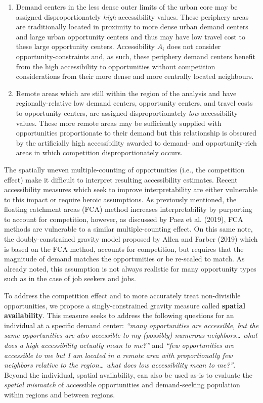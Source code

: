 \documentclass[]{elsarticle} %
\begin{document}
\begin{enumerate}
\def\labelenumi{\arabic{enumi})}
\item
  Demand centers in the less dense outer limits of the urban core may be
  assigned disproportionately \emph{high} accessibility values. These
  periphery areas are traditionally located in proximity to more dense
  urban demand centers and large urban opportunity centers and thus may
  have low travel cost to these large opportunity centers. Accessibility
  \(A_i\) does not consider opportunity-constraints and, as such, these
  periphery demand centers benefit from the high accessibility to
  opportunities without competition considerations from their more dense
  and more centrally located neighbours.
\item
  Remote areas which are still within the region of the analysis and
  have regionally-relative low demand centers, opportunity centers, and
  travel costs to opportunity centers, are assigned disproportionately
  \emph{low} accessibility values. These more remote areas may be
  sufficiently supplied with opportunities proportionate to their demand
  but this relationship is obscured by the artificially high
  accessibility awarded to demand- and opportunity-rich areas in which
  competition disproportionately occurs.
\end{enumerate}

The spatially uneven multiple-counting of opportunities (i.e., the
competition effect) make it difficult to interpret resulting
accessibility estimates. Recent accessibility measures which seek to
improve interpretability are either vulnerable to this impact or require
heroic assumptions. As previously mentioned, the floating catchment
areas (FCA) method increases interpretability by purporting to account
for competition, however, as discussed by Paez et al. (2019), FCA
methods are vulnerable to a similar multiple-counting effect. On this
same note, the doubly-constrained gravity model proposed by Allen and
Farber (2019) which is based on the FCA method, accounts for
competition, but requires that the magnitude of demand matches the
opportunities or be re-scaled to match. As already noted, this
assumption is not always realistic for many opportunity types such as in
the case of job seekers and jobs.

To address the competition effect and to more accurately treat
non-divisible opportunities, we propose a singly-constrained gravity
measure called \textbf{spatial availability}. This measure seeks to
address the following questions for an individual at a specific demand
center: \emph{``many opportunities are accessible, but the same
opportunities are also accessible to my (possibly) numerous
neighbors\ldots{} what does a high accessibility actually mean to me?''}
and \emph{``few opportunities are accessible to me but I am located in a
remote area with proportionally few neighbors relative to the
region\ldots{} what does low accessibility mean to me?''}. Beyond the
individual, spatial availability, can also be used as-is to evaluate the
\emph{spatial mismatch} of accessible opportunities and demand-seeking
population within regions and between regions.
\end{document}
